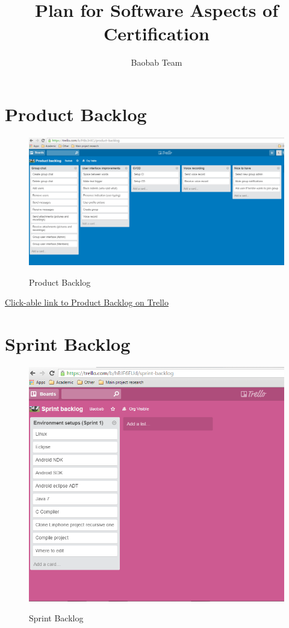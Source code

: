 \documentclass[a4paper]{article}
\title{Plan for Software Aspects of Certification}
\author{Baobab Team}
\begin{document}
\newpage


\newpage

\section{Product Backlog}

\begin{figure}[H]
\includegraphics[width=1\linewidth]{./pictures/backlog.jpg}\\
\caption{\label{fig:Product Backlog}Product Backlog}
\end{figure}

\href{https://trello.com/b/FtBs3HX1}{Click-able link to Product Backlog on Trello}
\newpage

\section{Sprint Backlog}

\begin{figure}[H]
\includegraphics[width=1\linewidth]{./pictures/sprintbacklog.jpg}\\
\caption{\label{fig:Sprint Backlog}Sprint Backlog}
\end{figure}
\end{document}
